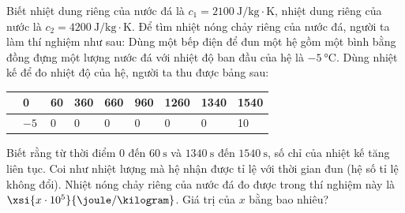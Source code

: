 \begin{ex}
	Biết nhiệt dung riêng của nước đá là $c_{1}=\SI{2100}{\joule/\kilogram\cdot\kelvin}$, nhiệt dung riêng của nước là $c_{2}=\SI{4200}{\joule/\kilogram\cdot\kelvin}$. Để tìm nhiệt nóng chảy riêng của nước đá, người ta làm thí nghiệm như sau: Dùng một bếp điện để đun một hệ gồm một bình bằng đồng đựng một lượng nước đá với nhiệt độ ban đầu của hệ là $\SI{-5}{\celsius}$. Dùng nhiệt kế để đo nhiệt độ của hệ, người ta thu được bảng sau:
	\begin{center}
		\begin{tabular}{|M{3cm}|M{1.5cm}|M{1.5cm}|M{1.5cm}|M{1.5cm}|M{1.5cm}|M{1.5cm}|M{1.5cm}|M{1.5cm}|}
		\hline
		 & 0& 60 & 360 & 660 & 960 & 1260 &1340 & 1540\\
		\hline
		& $\SI{-5}{}$ & 0&0&0&0&0&0&10\\
		\hline
		\end{tabular}
	\end{center}
	Biết rằng từ thời điểm 0 đến $\SI{60}{\second}$ và $\SI{1340}{\second}$ đến $\SI{1540}{\second}$, số chỉ của nhiệt kế tăng liên tục. Coi như nhiệt lượng mà hệ nhận được tỉ lệ với thời gian đun (hệ số tỉ lệ không đổi). Nhiệt nóng chảy riêng của nước đá đo được trong thí nghiệm này là $\xsi{x\cdot10^5}{\joule/\kilogram}$. Giá trị của $x$ bằng bao nhiêu?
\end{ex}
